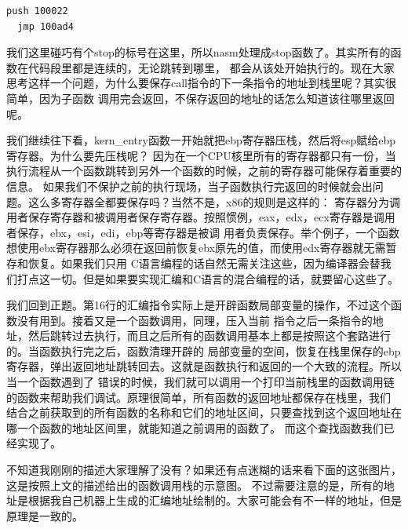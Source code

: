 \begin{Verbatim}[frame=single]
  push 100022
  jmp 100ad4
\end{Verbatim}

\par 我们这里碰巧有个stop的标号在这里，所以nasm处理成stop函数了。其实所有的函数在代码段里都是连续的，无论跳转到哪里，\allowbreak
都会从该处开始执行的。现在大家思考这样一个问题，为什么要保存call指令的下一条指令的地址到栈里呢？其实很简单，因为子函数\allowbreak
调用完会返回，不保存返回的地址的话怎么知道该往哪里返回呢。

\par 我们继续往下看，kern\_entry函数一开始就把ebp寄存器压栈，然后将esp赋给ebp寄存器。为什么要先压栈呢？\allowbreak
因为在一个CPU核里所有的寄存器都只有一份，当执行流程从一个函数跳转到另外一个函数的时候，之前的寄存器可能保存着重要的信息。\allowbreak
如果我们不保护之前的执行现场，当子函数执行完返回的时候就会出问题。这么多寄存器全都要保存吗？当然不是，x86的规则是这样的：\allowbreak
寄存器分为调用者保存寄存器和被调用者保存寄存器。按照惯例，eax，edx，ecx寄存器是调用者保存，ebx，esi，edi，ebp等寄存器是被调\allowbreak
用者负责保存。举个例子，一个函数想使用ebx寄存器那么必须在返回前恢复ebx原先的值，而使用edx寄存器就无需暂存和恢复。如果我们只用\allowbreak
C语言编程的话自然无需关注这些，因为编译器会替我们打点这一切。但是如果要实现汇编和C语言的混合编程的话，就要留心这些了。

\par 我们回到正题。第16行的汇编指令实际上是开辟函数局部变量的操作，不过这个函数没有用到。接着又是一个函数调用，同理，压入当前\allowbreak
指令之后一条指令的地址，然后跳转过去执行，而且之后所有的函数调用基本上都是按照这个套路进行的。当函数执行完之后，函数清理开辟的\allowbreak
局部变量的空间，恢复在栈里保存的ebp寄存器，弹出返回地址跳转回去。这就是函数执行和返回的一个大致的流程。所以当一个函数遇到了\allowbreak
错误的时候，我们就可以调用一个打印当前栈里的函数调用链的函数来帮助我们调试。原理很简单，所有函数的返回地址都保存在栈里，我们\allowbreak
结合之前获取到的所有函数的名称和它们的地址区间，只要查找到这个返回地址在哪一个函数的地址区间里，就能知道之前调用的函数了。\allowbreak
而这个查找函数我们已经实现了。

\par 不知道我刚刚的描述大家理解了没有？如果还有点迷糊的话来看下面的这张图片，这是按照上文的描述给出的函数调用栈的示意图。\allowbreak
不过需要注意的是，所有的地址是根据我自己机器上生成的汇编地址绘制的。大家可能会有不一样的地址，但是原理是一致的。

